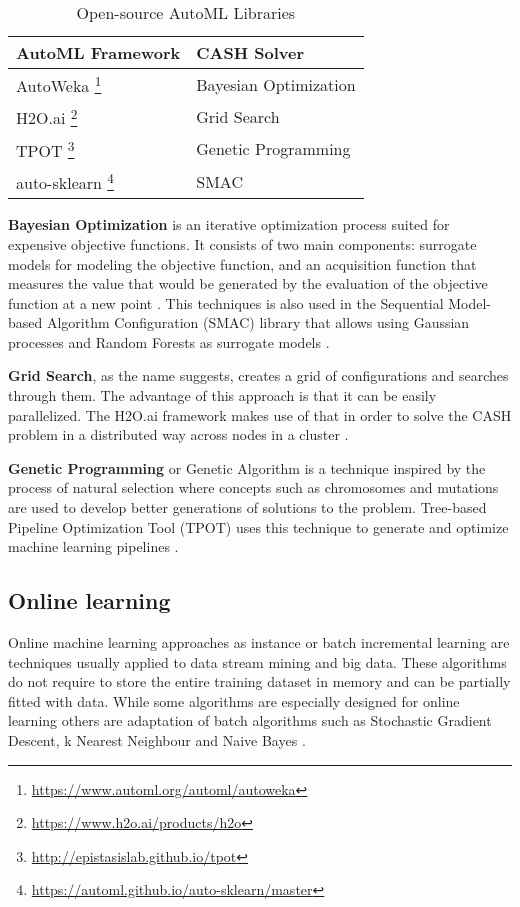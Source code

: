 \documentclass{sig-alternate-br}
\begin{document}
\begin{savenotes}
\begin{table}[h]
\renewcommand{\arraystretch}{1.25}
\centering
\begin{tabular}{|l|l|}
\hline
\textbf{AutoML Framework} & \textbf{CASH Solver} \\ \hline
AutoWeka \footnote{\url{https://www.automl.org/automl/autoweka}} & Bayesian Optimization \\ \hline
H2O.ai \footnote{\url{https://www.h2o.ai/products/h2o}} & Grid Search \\ \hline
TPOT \footnote{\url{http://epistasislab.github.io/tpot}} & Genetic Programming \\ \hline
auto-sklearn \footnote{\url{https://automl.github.io/auto-sklearn/master}} &  SMAC \\ \hline
\end{tabular}
\caption{Open-source AutoML Libraries}
\label{table:libraries}
\end{table}
\end{savenotes}

\textbf{Bayesian Optimization} is an iterative optimization process suited for expensive objective functions. It consists of two main components: surrogate models for modeling the objective function, and an acquisition function that measures the value that would be generated by the evaluation of the objective function at a new point \cite{zoller2019survey}. This techniques is also used in the Sequential Model-based Algorithm Configuration (SMAC) library that allows using Gaussian processes and Random Forests as surrogate models \cite{feurer2015autosklearn}.

\textbf{Grid Search}, as the name suggests, creates a grid of configurations and searches through them. The advantage of this approach is that it can be easily parallelized. The H2O.ai framework makes use of that in order to solve the CASH problem in a distributed way across nodes in a cluster \cite{h2o}. 

\textbf{Genetic Programming} or Genetic Algorithm is a technique inspired by the process of natural selection where concepts such as chromosomes and mutations are used to develop better generations of solutions to the problem. Tree-based Pipeline Optimization Tool (TPOT) uses this technique to generate and optimize machine learning pipelines \cite{tpot}.

\subsection{Online learning}
Online machine learning approaches as instance or batch incremental learning are techniques usually applied to data stream mining and big data. These algorithms do not require to store the entire training dataset in memory and can be partially fitted with data. While some algorithms are especially designed for online learning \cite{bifet2012ensembles} others are adaptation of batch algorithms such as Stochastic Gradient Descent, k Nearest Neighbour and Naive Bayes \cite{van2014algorithm}. 
\end{document}
